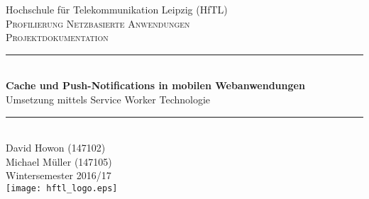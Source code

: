 \begin{titlepage}

\newcommand{\HRule}{\rule{\linewidth}{0.5mm}} %

\center %
 

\LARGE Hochschule für Telekommunikation Leipzig (HfTL)\\[1.2cm] %
\textsc{\Large Profilierung Netzbasierte Anwendungen}\\[0.5cm] %
\textsc{\large Projektdokumentation}\\[0.5cm] %


\HRule \\[0.4cm]
{ \LARGE \bfseries Cache und Push-Notifications in mobilen Webanwendungen}\\ %
{\Large Umsetzung mittels Service Worker Technologie}
\HRule \\[1cm]
 

\Large David Howon (147102)\\[1cm] 

\Large Michael Müller (147105)\\[1cm] 


{\large Wintersemester 2016/17}\\[2cm] %


\texttt{[image: hftl\_logo.eps]}\\[1cm] %
 

\vfill %

\end{titlepage}